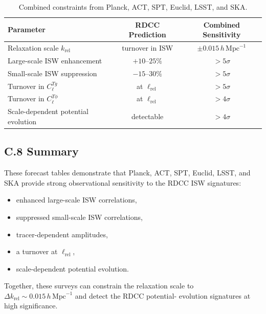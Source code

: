 \documentclass[11pt,a4paper]{article}
\begin{document}
\begin{table}[H]
\centering
\begin{tabular}{lcc}
\hline
\textbf{Parameter} & \textbf{RDCC Prediction} & \textbf{Combined Sensitivity} \\
\hline
Relaxation scale $k_{\mathrm{rel}}$ & turnover in ISW & $\pm 0.015\,h\,\mathrm{Mpc}^{-1}$ \\
Large-scale ISW enhancement & $+10$--$25\%$ & $>5\sigma$ \\
Small-scale ISW suppression & $-15$--$30\%$ & $>5\sigma$ \\
Turnover in $C_{\ell}^{Tg}$ & at $\ell_{\mathrm{rel}}$ & $>5\sigma$ \\
Turnover in $C_{\ell}^{T\phi}$ & at $\ell_{\mathrm{rel}}$ & $>4\sigma$ \\
Scale-dependent potential evolution & detectable & $>4\sigma$ \\
\hline
\end{tabular}
\caption{Combined constraints from Planck, ACT, SPT, Euclid, LSST, and SKA.}
\end{table}

\subsection*{C.8 Summary}

These forecast tables demonstrate that Planck, ACT, SPT, Euclid, LSST, and SKA provide strong 
observational sensitivity to the RDCC ISW signatures:

\begin{itemize}
    \item enhanced large-scale ISW correlations,
    \item suppressed small-scale ISW correlations,
    \item tracer-dependent amplitudes,
    \item a turnover at $\ell_{\mathrm{rel}}$,
    \item scale-dependent potential evolution.
\end{itemize}

Together, these surveys can constrain the relaxation scale to 
$\Delta k_{\mathrm{rel}} \sim 0.015\,h\,\mathrm{Mpc}^{-1}$ and detect the RDCC potential-
evolution signatures at high significance.


\nocite{*}

\end{document}
